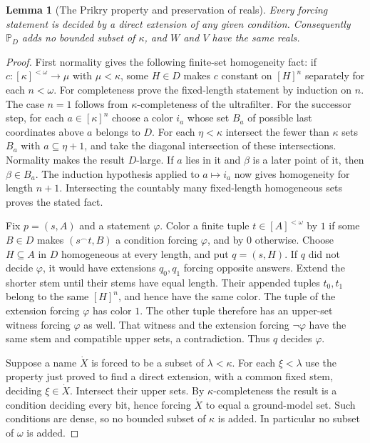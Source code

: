 \documentclass[11pt,a4paper]{article}
\numberwithin{equation}{section}
\newtheorem{lemma}[lemma]{Lemma}
\theoremstyle{definition}
\theoremstyle{remark}
\begin{document}
\begin{lemma}[The Prikry property and preservation of reals]
\label{dsn:rp:lem:prikry-property}
Every forcing statement is decided by a direct extension of any given
condition.  Consequently $\mathbb P_D$ adds no bounded subset of
$\kappa$, and $W$ and $V$ have the same reals.
\end{lemma}
\begin{proof}
First normality gives the following finite-set homogeneity fact: if
$c:[\kappa]^{<\omega}\to\mu$ with $\mu<\kappa$, some $H\in D$ makes
$c$ constant on $[H]^n$ separately for each $n<\omega$.
For completeness prove the fixed-length statement by induction on $n$.
The case $n=1$ follows from $\kappa$-completeness of the ultrafilter.
For the successor step, for each $a\in[\kappa]^n$ choose a color $i_a$
whose set $B_a$ of possible last coordinates above $a$ belongs to $D$.
For each $\eta<\kappa$ intersect the fewer than $\kappa$ sets $B_a$
with $a\subseteq\eta+1$, and take the diagonal intersection of these
intersections.  Normality makes the result $D$-large.  If $a$ lies
in it and $\beta$ is a later point of it, then $\beta\in B_a$.
The induction hypothesis applied to $a\mapsto i_a$ now gives
homogeneity for length $n+1$.  Intersecting the countably many
fixed-length homogeneous sets proves the stated fact.

Fix $p=(s,A)$ and a statement $\varphi$.  Color a finite tuple
$t\in[A]^{<\omega}$ by $1$ if some $B\in D$ makes
$(s^\frown t,B)$ a condition forcing $\varphi$, and by $0$ otherwise.
Choose $H\subseteq A$ in $D$ homogeneous at every length, and put
$q=(s,H)$.  If $q$ did not decide $\varphi$, it would have extensions
$q_0,q_1$ forcing opposite answers.  Extend the shorter stem until
their stems have equal length.  Their appended tuples $t_0,t_1$
belong to the same $[H]^n$, and hence have the same color.  The tuple
of the extension forcing $\varphi$ has color $1$.  The other tuple
therefore has an upper-set witness forcing $\varphi$ as well.
That witness and the extension forcing $\neg\varphi$ have the same
stem and compatible upper sets, a contradiction.  Thus $q$ decides
$\varphi$.

Suppose a name $\dot X$ is forced to be a subset of $\lambda<\kappa$.
For each $\xi<\lambda$ use the property just proved to find a direct
extension, with a common fixed stem, deciding $\xi\in\dot X$.
Intersect their upper sets.  By $\kappa$-completeness the result is
a condition deciding every bit, hence forcing $\dot X$ to equal a
ground-model set.  Such conditions are dense, so no bounded subset
of $\kappa$ is added.  In particular no subset of $\omega$ is added.
\end{proof}
\end{document}

